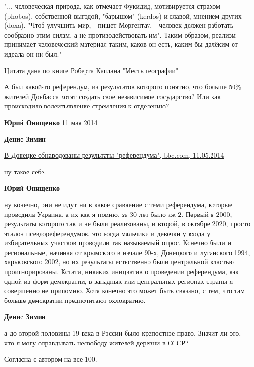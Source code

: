 \begin{itemize}
"... человеческая природа, как отмечает Фукидид, мотивируется страхом (phobos),
собственной выгодой, "барышом" (kerdos) и славой, мнением других (doxa). "Чтоб
улучшить мир, - пишет Моргентау, - человек должен работать сообразно этим
силам, а не противодействовать им". Таким образом, реализм принимает
человеческий материал таким, каков он есть, каким бы далёким от идеала он ни
был."

Цитата дана по книге Роберта Каплана "Месть географии"


А был какой-то референдум, из результатов которого понятно, что больше 50\%
жителей Донбасса хотят создать свое независимое государство? Или как
происходило волеизъявление стремления к отделению?

\begin{itemize} %
\textbf{Юрий Онищенко} 11 мая 2014

\textbf{Денис Зимин} 

\href{https://www.bbc.com/ukrainian/ukraine_in_russian/2014/05/140511_ru_s_donbass_referendum}{%
В Донецке обнародованы результаты "референдума", bbc.com, 11.05.2014%
}

ну такое себе.

\textbf{Юрий Онищенко} 

ну конечно, они не идут ни в какое сравнение с теми референдума, которые
проводила Украина, а их как я помню, за 30 лет было аж 2. Первый в 2000,
результаты которого так и не были реализованы, и второй, в октябре 2020, просто
эталон псевдореферендумов, это когда мальчики и девочки у входа у избирательных
участков проводили так называемый опрос. Конечно были и региональные, начиная
от крымского в начале 90-х, Донецкого и луганского 1994, харьковского 2002, но
их результаты естественно были центральной властью проигнорированы. Кстати,
никаких инициатив о проведении референдума, как одной из форм демократии, в
западных или центральных регионах страны я совершенно не припомню. Хотя конечно
это может быть связано, с тем, что там больше демократии предпочитают
охлократию.


\textbf{Денис Зимин} 

а до второй половины 19 века в России было крепостное право. Значит ли это, что
я могу оправдывать несвободу жителей деревни в СССР?

\end{itemize} %

Согласна с автором на все 100.


\end{itemize}
